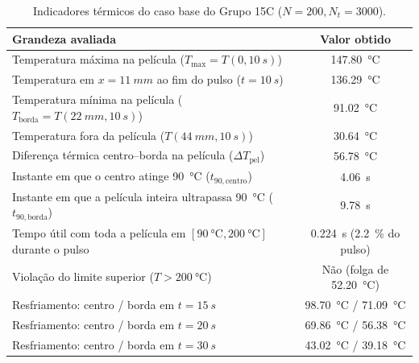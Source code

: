 \documentclass[11pt,a4paper]{article}
\begin{document}
\begin{table}[H]
    \centering
    \caption{Indicadores térmicos do caso base do Grupo 15C ($N = 200, N_t = 3000$).}
    \label{tab:resumo_base}
    \begin{tabular}{lc}
        \toprule
        \textbf{Grandeza avaliada} & \textbf{Valor obtido} \\
        \midrule
        Temperatura máxima na película ($T_{\max} = T(0, \SI{10}{s})$) & \SI{147,80}{\celsius} \\
        Temperatura em $x = \SI{11}{mm}$ ao fim do pulso ($t = \SI{10}{s}$) & \SI{136,29}{\celsius} \\
        Temperatura mínima na película ($T_{\text{borda}} = T(\SI{22}{mm}, \SI{10}{s})$) & \SI{91,02}{\celsius} \\
        Temperatura fora da película ($T(\SI{44}{mm}, \SI{10}{s})$) & \SI{30,64}{\celsius} \\
        Diferença térmica centro--borda na película ($\Delta T_{\text{pel}}$) & \SI{56,78}{\celsius} \\
        Instante em que o centro atinge \SI{90}{\celsius} ($t_{90,\text{centro}}$) & \SI{4,06}{s} \\
        Instante em que a película inteira ultrapassa \SI{90}{\celsius} ($t_{90,\text{borda}}$) & \SI{9,78}{s} \\
        Tempo útil com toda a película em $[\SI{90}{\celsius}, \SI{200}{\celsius}]$ durante o pulso & \SI{0,224}{s} (\SI{2,2}{\percent} do pulso) \\
        Violação do limite superior ($T > \SI{200}{\celsius}$) & Não (folga de \SI{52,20}{\celsius}) \\
        Resfriamento: centro / borda em $t = \SI{15}{s}$ & \SI{98,70}{\celsius} / \SI{71,09}{\celsius} \\
        Resfriamento: centro / borda em $t = \SI{20}{s}$ & \SI{69,86}{\celsius} / \SI{56,38}{\celsius} \\
        Resfriamento: centro / borda em $t = \SI{30}{s}$ & \SI{43,02}{\celsius} / \SI{39,18}{\celsius} \\
        \bottomrule
    \end{tabular}
\end{table}
\end{document}
